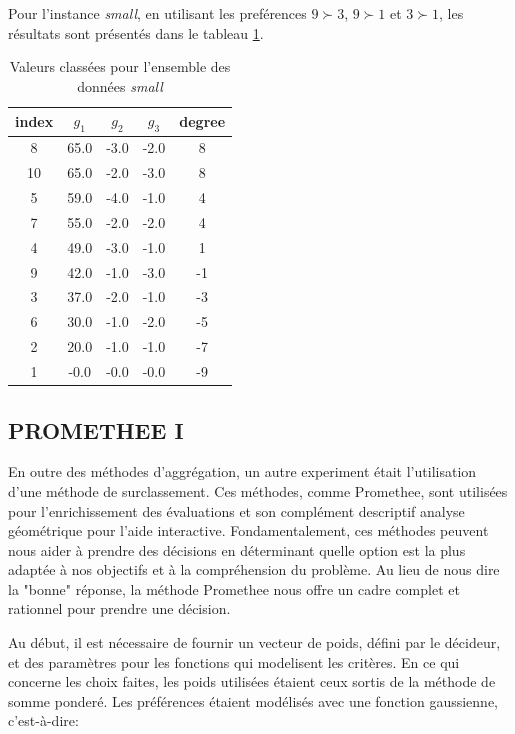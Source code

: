 \documentclass[12pt, a4paper, french, version=last, parskip=half, titlepage]{scrartcl}
\begin{document}
Pour l'instance \emph{small}, en utilisant les preférences $9 \succ 3$, $9 \succ 1$ et $3 \succ 1$, les résultats sont présentés dans le tableau \ref{tab:somme_pond_small}.


\begin{table}[htbp]
\centering
\begin{tabular}{c c c c c}
\toprule
index & $g_1$ & $g_2$ & $g_3$ & degree \\
\midrule
8 & 65.0 & -3.0 & -2.0 & 8 \\
10 & 65.0 & -2.0 & -3.0 & 8 \\
5 & 59.0 & -4.0 & -1.0 & 4 \\
7 & 55.0 & -2.0 & -2.0 & 4 \\
4 & 49.0 & -3.0 & -1.0 & 1 \\
9 & 42.0 & -1.0 & -3.0 & -1 \\
3 & 37.0 & -2.0 & -1.0 & -3 \\
6 & 30.0 & -1.0 & -2.0 & -5 \\
2 & 20.0 & -1.0 & -1.0 & -7 \\
1 & -0.0 & -0.0 & -0.0 & -9 \\ 
\bottomrule
\end{tabular}
\caption{Valeurs classées pour l’ensemble des données \emph{small}}
\label{tab:somme_pond_small}
\end{table}



\subsection{PROMETHEE I}

En outre des méthodes d'aggrégation, un autre experiment était l'utilisation d'une méthode de surclassement. Ces méthodes, comme Promethee, sont utilisées pour l'enrichissement des évaluations et son complément descriptif analyse géométrique pour l'aide interactive. Fondamentalement, ces méthodes peuvent nous aider à prendre des décisions en déterminant quelle option est la plus adaptée à nos objectifs et à la compréhension du problème. Au lieu de nous dire la "bonne" réponse, la méthode Promethee nous offre un cadre complet et rationnel pour prendre une décision.

Au début, il est nécessaire de fournir un vecteur de poids, défini par le décideur, et des paramètres pour les fonctions qui modelisent les critères. En ce qui concerne les choix faites, les poids utilisées étaient ceux sortis de la méthode de somme ponderé. Les préférences étaient modélisés avec une fonction gaussienne, c'est-à-dire:
\end{document}
